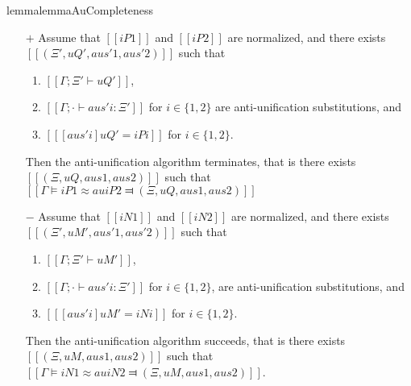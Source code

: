 \begin{restatable}{lemma}{lemmaAuCompleteness}
    \label{lemma:au-completeness}
    \hfill
    \begin{itemize}
        \item [$+$] 
            Assume that $[[iP1]]$ and $[[iP2]]$ are normalized, and
            there exists $[[(Ξ', uQ', aus'1, aus'2)]]$ such that
            \begin{enumerate}
                \item $[[Γ ; Ξ' ⊢ uQ']]$,
                \item $[[Γ ; · ⊢ aus'i : Ξ']]$ for $i \in \{1,2\}$ 
                are anti-unification substitutions, and
                \item $[[ [aus'i] uQ' = iPi ]]$ for $i \in \{1,2\}$.
            \end{enumerate}

            Then the anti-unification algorithm terminates, that is there exists
            $[[(Ξ, uQ, aus1, aus2)]]$ such that $[[Γ ⊨ iP1 ≈au iP2 ⫤ (Ξ, uQ, aus1, aus2)]]$

        \item [$-$] 
            Assume that $[[iN1]]$ and $[[iN2]]$ are normalized, and
            there exists $[[(Ξ', uM', aus'1, aus'2)]]$ such that
            \begin{enumerate}
                \item $[[Γ ; Ξ' ⊢ uM']]$,
                \item $[[Γ ; · ⊢ aus'i : Ξ']]$ for $i \in \{1,2\}$,
                are anti-unification substitutions, and
                \item $[[ [aus'i] uM' = iNi ]]$ for $i \in \{1,2\}$.
            \end{enumerate}

            Then the anti-unification algorithm succeeds, that is 
            there exists $[[(Ξ, uM, aus1, aus2)]]$ such that
            $[[Γ ⊨ iN1 ≈au iN2 ⫤ (Ξ, uM, aus1, aus2)]]$.
    \end{itemize}
\end{restatable}

